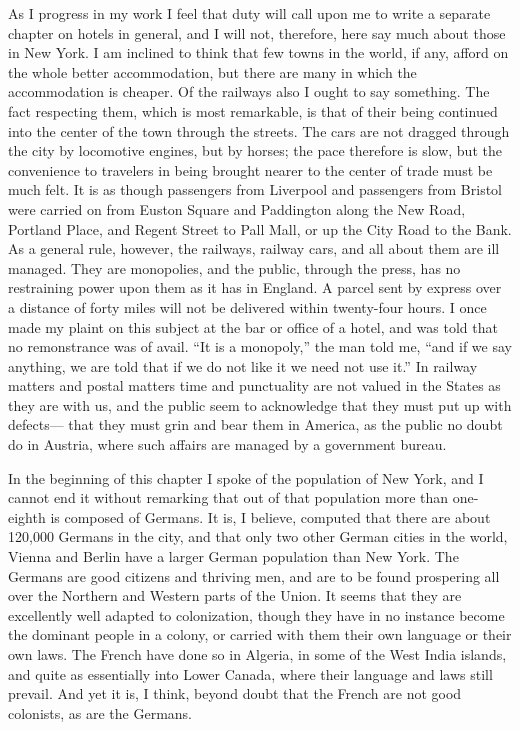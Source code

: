 As I progress in my work I feel that duty will call upon me to
write a separate chapter on hotels in general, and I will not,
therefore, here say much about those in New York.  I am inclined to
think that few towns in the world, if any, afford on the whole
better accommodation, but there are many in which the accommodation
is cheaper.  Of the railways also I ought to say something.  The
fact respecting them, which is most remarkable, is that of their
being continued into the center of the town through the streets.
The cars are not dragged through the city by locomotive engines,
but by horses; the pace therefore is slow, but the convenience to
travelers in being brought nearer to the center of trade must be
much felt.  It is as though passengers from Liverpool and
passengers from Bristol were carried on from Euston Square and
Paddington along the New Road, Portland Place, and Regent Street to
Pall Mall, or up the City Road to the Bank.  As a general rule,
however, the railways, railway cars, and all about them are ill
managed.  They are monopolies, and the public, through the press,
has no restraining power upon them as it has in England.  A parcel
sent by express over a distance of forty miles will not be
delivered within twenty-four hours.  I once made my plaint on this
subject at the bar or office of a hotel, and was told that no
remonstrance was of avail.  ``It is a monopoly,'' the man told me,
``and if we say anything, we are told that if we do not like it we
need not use it.''  In railway matters and postal matters time and
punctuality are not valued in the States as they are with us, and
the public seem to acknowledge that they must put up with defects---%
that they must grin and bear them in America, as the public no
doubt do in Austria, where such affairs are managed by a government
bureau.

In the beginning of this chapter I spoke of the population of New
York, and I cannot end it without remarking that out of that
population more than one-eighth is composed of Germans.  It is, I
believe, computed that there are about 120,000 Germans in the city,
and that only two other German cities in the world, Vienna and
Berlin have a larger German population than New York.  The Germans
are good citizens and thriving men, and are to be found prospering
all over the Northern and Western parts of the Union.  It seems
that they are excellently well adapted to colonization, though they
have in no instance become the dominant people in a colony, or
carried with them their own language or their own laws.  The French
have done so in Algeria, in some of the West India islands, and
quite as essentially into Lower Canada, where their language and
laws still prevail.  And yet it is, I think, beyond doubt that the
French are not good colonists, as are the Germans.

